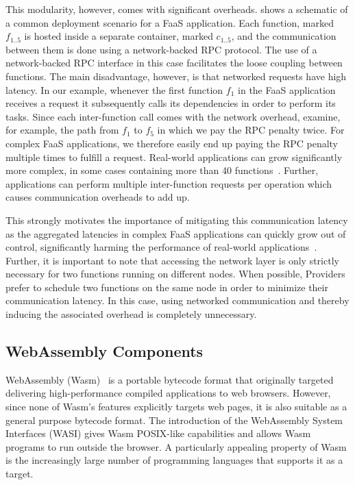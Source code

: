 This modularity, however, comes with significant overheads.  shows a schematic of a common deployment scenario for a FaaS application. Each function, marked $f_{1..5}$ is hosted inside a separate container, marked $c_{1..5}$, and the communication between them is done using a network-backed RPC protocol. The use of a network-backed RPC interface in this case facilitates the loose coupling between functions. The main disadvantage, however, is that networked requests have high latency. In our example, whenever the first function $f_1$ in the FaaS application receives a request it subsequently calls its dependencies in order to perform its tasks. Since each inter-function call comes with the network overhead, examine, for example, the path from $f_1$ to $f_5$ in which we pay the RPC penalty twice. For complex FaaS applications, we therefore easily end up paying the RPC penalty multiple times to fulfill a request. Real-world applications can grow significantly more complex, in some cases containing more than 40 functions~\cite{gan19_open_sourc_bench_suite_micros}. Further, applications can perform multiple inter-function requests per operation which causes communication overheads to add up.

This strongly motivates the importance of mitigating this communication latency as the aggregated latencies in complex FaaS applications can quickly grow out of control, significantly harming the performance of real-world applications~\cite{gan19_open_sourc_bench_suite_micros}. Further, it is important to note that accessing the network layer is only strictly necessary for two functions running on different nodes. When possible, Providers prefer to schedule two functions on the same node in order to minimize their communication latency. In this case, using networked communication and thereby inducing the associated overhead is completely unnecessary.

\subsection{WebAssembly Components}
\label{subsec:wasm}

WebAssembly (Wasm)~\cite{rossberg22_webas_core_specif} is a portable bytecode format that originally targeted delivering high-performance compiled applications to web browsers. However, since none of Wasm's features explicitly targets web pages, it is also suitable as a general purpose bytecode format. The introduction of the WebAssembly System Interfaces (WASI) gives Wasm POSIX-like capabilities and allows Wasm programs to run outside the browser. A particularly appealing property of Wasm is the increasingly large number of programming languages that supports it as a target.

